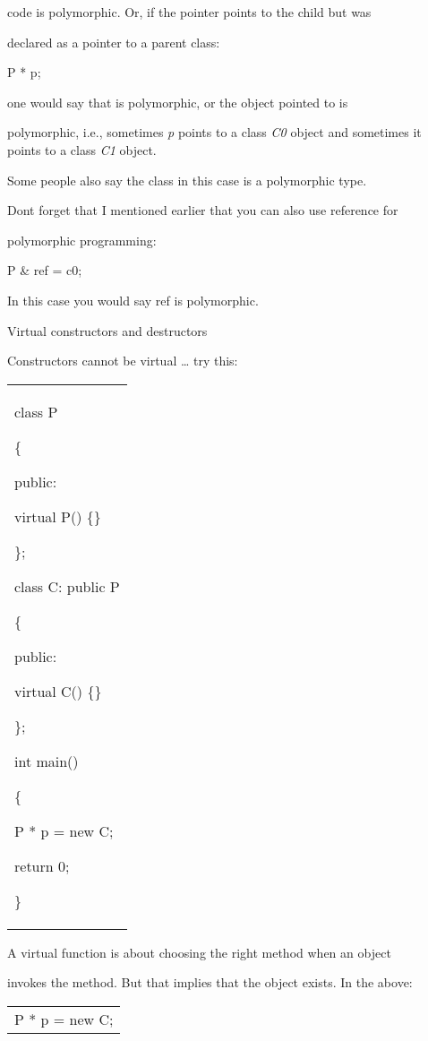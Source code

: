 \documentclass[
]{article}
\begin{document}
code is polymorphic. Or, if the pointer points to the child but was

declared as a pointer to a parent class:

P * p;

one would say that is polymorphic, or the object pointed to is

polymorphic, i.e., sometimes \emph{p} points to a class \emph{C0} object
and sometimes it points to a class \emph{C1} object.

Some people also say the class in this case is a polymorphic type.

Don\textquotesingle t forget that I mentioned earlier that you can also
use reference for

polymorphic programming:

P \& ref = c0;

In this case you would say ref is polymorphic.

Virtual constructors and destructors

Constructors cannot be virtual \ldots{} try this:

\begin{longtable}[]{@{}
  >{\raggedright\arraybackslash}p{}@{}}
\toprule\noalign{}
 \\
\midrule\noalign{}
\endhead
\bottomrule\noalign{}
\endlastfoot
class P

\{

public:

virtual P() \{\}

\};

class C: public P

\{

public:

virtual C() \{\}

\};

int main()

\{

P * p = new C;

return 0;

\} \\
\end{longtable}

A virtual function is about choosing the right method when an object

invokes the method. But that implies that the object exists. In the
above:

\begin{longtable}[]{@{}l@{}}
\toprule\noalign{}
 \\
\midrule\noalign{}
\endhead
\bottomrule\noalign{}
\endlastfoot
P * p = new C; \\
\end{longtable}
\end{document}
